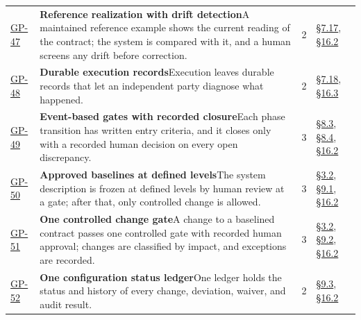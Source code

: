 \begin{longtable}{@{}p{} p{} r p{}@{}}
\hyperlink{gp-47}{GP-47}\hypertarget{gp-47}{} & \textbf{Reference realization with drift detection}\newline A maintained reference example shows the current reading of the contract; the system is compared with it, and a human screens any drift before correction.\rule[-\normalbaselineskip]{0pt}{0pt} & 2 & \hyperlink{nss-7.17}{\S7.17}, \hyperlink{nss-16.2}{\S16.2}\rule[-\normalbaselineskip]{0pt}{0pt} \\
\hyperlink{gp-48}{GP-48}\hypertarget{gp-48}{} & \textbf{Durable execution records}\newline Execution leaves durable records that let an independent party diagnose what happened.\rule[-\normalbaselineskip]{0pt}{0pt} & 2 & \hyperlink{nss-7.18}{\S7.18}, \hyperlink{nss-16.3}{\S16.3}\rule[-\normalbaselineskip]{0pt}{0pt} \\
\hyperlink{gp-49}{GP-49}\hypertarget{gp-49}{} & \textbf{Event-based gates with recorded closure}\newline Each phase transition has written entry criteria, and it closes only with a recorded human decision on every open discrepancy.\rule[-\normalbaselineskip]{0pt}{0pt} & 3 & \hyperlink{nss-8.3}{\S8.3}, \hyperlink{nss-8.4}{\S8.4}, \hyperlink{nss-16.2}{\S16.2}\rule[-\normalbaselineskip]{0pt}{0pt} \\
\hyperlink{gp-50}{GP-50}\hypertarget{gp-50}{} & \textbf{Approved baselines at defined levels}\newline The system description is frozen at defined levels by human review at a gate; after that, only controlled change is allowed.\rule[-\normalbaselineskip]{0pt}{0pt} & 3 & \hyperlink{nss-3.2}{\S3.2}, \hyperlink{nss-9.1}{\S9.1}, \hyperlink{nss-16.2}{\S16.2}\rule[-\normalbaselineskip]{0pt}{0pt} \\
\hyperlink{gp-51}{GP-51}\hypertarget{gp-51}{} & \textbf{One controlled change gate}\newline A change to a baselined contract passes one controlled gate with recorded human approval; changes are classified by impact, and exceptions are recorded.\rule[-\normalbaselineskip]{0pt}{0pt} & 3 & \hyperlink{nss-3.2}{\S3.2}, \hyperlink{nss-9.2}{\S9.2}, \hyperlink{nss-16.2}{\S16.2}\rule[-\normalbaselineskip]{0pt}{0pt} \\
\hyperlink{gp-52}{GP-52}\hypertarget{gp-52}{} & \textbf{One configuration status ledger}\newline One ledger holds the status and history of every change, deviation, waiver, and audit result.\rule[-\normalbaselineskip]{0pt}{0pt} & 2 & \hyperlink{nss-9.3}{\S9.3}, \hyperlink{nss-16.2}{\S16.2}\rule[-\normalbaselineskip]{0pt}{0pt} \\

\end{longtable}
